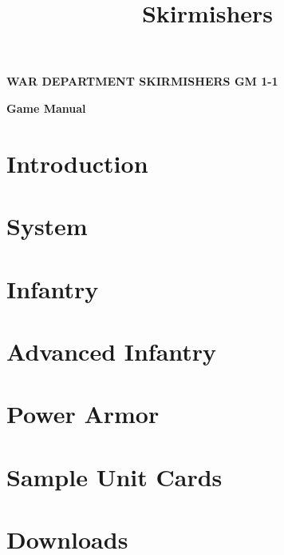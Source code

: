 \documentclass{article}
\title{Skirmishers}
\author{}
\date{}
\newcommand{\mysectiontitle}{}
\newcommand{\newsection}[2]{\renewcommand{\mysectiontitle}{#2}\section{#1}}
\begin{document}
\makeatletter
{}

\begin{center}
  \fontsize{30}{37}\bfseries\selectfont\MakeUppercase{War Department}
  \fontsize{50}{60}\bfseries\selectfont\MakeUppercase{Skirmishers}
  \fontsize{30}{37}\bfseries\selectfont\MakeUppercase{GM 1-1}

  \LARGE\bfseries{Game Manual}
\end{center}

\newsection{Introduction}{introduction}



\newpage

\newsection{System}{system}



\newpage

\newsection{Infantry}{infantry}



\newpage

\newsection{Advanced Infantry}{advanced-infantry}



\newpage

\newsection{Power Armor}{power-armor}



\newpage

\newsection{Sample Unit Cards}{sample-unit-cards}



\newpage

\newsection{Downloads}{downloads}
\label{sec:downloads}



\newpage
\end{document}
